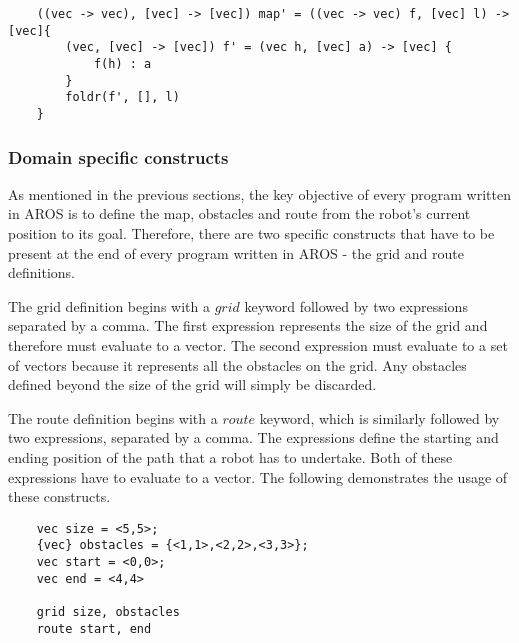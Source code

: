 \begin{lstlisting}
    ((vec -> vec), [vec] -> [vec]) map' = ((vec -> vec) f, [vec] l) -> [vec]{
        (vec, [vec] -> [vec]) f' = (vec h, [vec] a) -> [vec] {
            f(h) : a
        }
        foldr(f', [], l)
    }
\end{lstlisting}

\subsubsection{Domain specific constructs}
As mentioned in the previous sections, the key objective of every program written in AROS is to define the map, obstacles and route from the robot's current position to its goal. Therefore, there are two specific constructs that have to be present at the end of every program written in AROS - the grid and route definitions. 

 \par
 The grid definition begins with a $\textit{grid}$ keyword followed by two expressions separated by a comma. The first expression represents the size of the grid and therefore must evaluate to a vector. The second expression must evaluate to a set of vectors because it represents all the obstacles on the grid. Any obstacles defined beyond the size of the grid will simply be discarded. 
 
 \par 
 The route definition begins with a $\textit{route}$ keyword, which is similarly followed by two expressions, separated by a comma. The expressions define the starting and ending position of the path that a robot has to undertake. Both of these expressions have to evaluate to a vector. The following demonstrates the usage of these constructs.
 
 \newblock
 
\begin{lstlisting}
    vec size = <5,5>;
    {vec} obstacles = {<1,1>,<2,2>,<3,3>};
    vec start = <0,0>;
    vec end = <4,4>
    
    grid size, obstacles
    route start, end
\end{lstlisting}